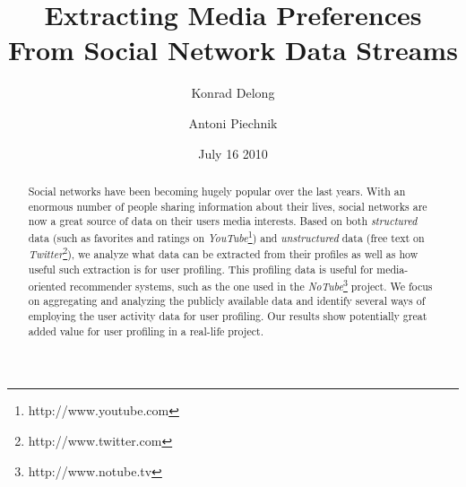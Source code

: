 \documentclass{article}
\begin{document}
\title{\textbf{Extracting Media Preferences From Social Network Data Streams}}
\author{Konrad Delong \and Antoni Piechnik}
\date{July 16 2010}

\maketitle

\begin{abstract} Social networks have been becoming hugely popular over the last
years. With an enormous number of people sharing information about their lives,
social networks are now a great source of data on their users media interests. Based on both
\textit{structured} data (such as favorites and ratings on \textit{YouTube}\footnote{http://www.youtube.com})
and \textit{unstructured} data (free text on \textit{Twitter}\footnote{http://www.twitter.com}),
we analyze what data can be extracted from their profiles as well as how useful such extraction
is for user profiling. This profiling data is useful for media-oriented recommender
systems, such as the one used in the \textit{NoTube}\footnote{http://www.notube.tv} project.
We focus on aggregating and analyzing the publicly available data and
identify several ways of employing the user activity data for user profiling.
Our results show potentially great added value for user profiling in a real-life project.
\end{abstract}

















\end{document}
